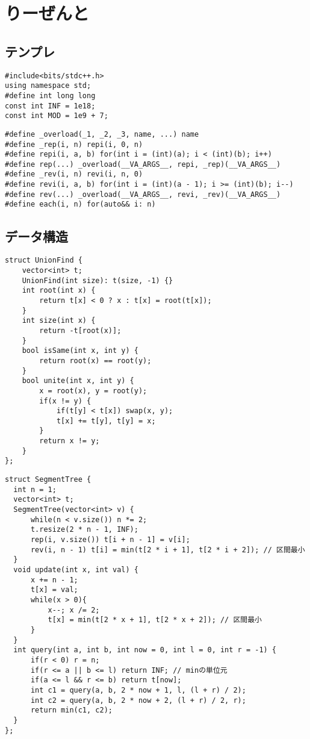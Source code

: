 \documentclass{jsarticle}
\begin{document}
\section*{りーぜんと}
\subsection*{テンプレ}
\begin{lstlisting}[caption=テンプレ]
#include<bits/stdc++.h>
using namespace std;
#define int long long
const int INF = 1e18;
const int MOD = 1e9 + 7;
\end{lstlisting}
\begin{lstlisting}[caption=ループ]
#define _overload(_1, _2, _3, name, ...) name
#define _rep(i, n) repi(i, 0, n)
#define repi(i, a, b) for(int i = (int)(a); i < (int)(b); i++)
#define rep(...) _overload(__VA_ARGS__, repi, _rep)(__VA_ARGS__)
#define _rev(i, n) revi(i, n, 0)
#define revi(i, a, b) for(int i = (int)(a - 1); i >= (int)(b); i--)
#define rev(...) _overload(__VA_ARGS__, revi, _rev)(__VA_ARGS__)
#define each(i, n) for(auto&& i: n)
\end{lstlisting}

\subsection*{データ構造}
\begin{lstlisting}[caption=UnionFind]
struct UnionFind {
    vector<int> t;
    UnionFind(int size): t(size, -1) {}
    int root(int x) {
        return t[x] < 0 ? x : t[x] = root(t[x]);
    }
    int size(int x) {
        return -t[root(x)];
    }
    bool isSame(int x, int y) {
        return root(x) == root(y);
    }
    bool unite(int x, int y) {
        x = root(x), y = root(y);
        if(x != y) {
            if(t[y] < t[x]) swap(x, y);
            t[x] += t[y], t[y] = x;
        }
        return x != y;
    }
};
\end{lstlisting}
\begin{lstlisting}[caption=セグ木]
struct SegmentTree {
  int n = 1;
  vector<int> t;
  SegmentTree(vector<int> v) {
      while(n < v.size()) n *= 2;
      t.resize(2 * n - 1, INF);
      rep(i, v.size()) t[i + n - 1] = v[i];
      rev(i, n - 1) t[i] = min(t[2 * i + 1], t[2 * i + 2]); // 区間最小
  }
  void update(int x, int val) {
      x += n - 1;
      t[x] = val;
      while(x > 0){
          x--; x /= 2;
          t[x] = min(t[2 * x + 1], t[2 * x + 2]); // 区間最小
      }
  }
  int query(int a, int b, int now = 0, int l = 0, int r = -1) {
      if(r < 0) r = n;
      if(r <= a || b <= l) return INF; // minの単位元
      if(a <= l && r <= b) return t[now];
      int c1 = query(a, b, 2 * now + 1, l, (l + r) / 2);
      int c2 = query(a, b, 2 * now + 2, (l + r) / 2, r);
      return min(c1, c2);
  }
};
\end{lstlisting}
\end{document}
